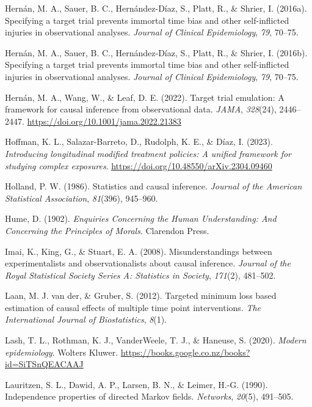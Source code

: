 \documentclass[
  single column]{article}
\newlength{\cslhangindent}
\newenvironment{CSLReferences}[2] %
 {\begin{list}{}{%
  \setlength{\itemindent}{0pt}
  \setlength{\leftmargin}{0pt}
  \setlength{\parsep}{0pt}
  \ifodd #1
   \setlength{\leftmargin}{\cslhangindent}
   \setlength{\itemindent}{-1\cslhangindent}
  \fi
  \setlength{\itemsep}{#2\baselineskip}}}
 {\end{list}}
\begin{document}
\begin{CSLReferences}{1}{0}
Hernán, M. A., Sauer, B. C., Hernández-Díaz, S., Platt, R., \& Shrier,
I. (2016a). Specifying a target trial prevents immortal time bias and
other self-inflicted injuries in observational analyses. \emph{Journal
of Clinical Epidemiology}, \emph{79}, 70--75.

Hernán, M. A., Sauer, B. C., Hernández-Díaz, S., Platt, R., \& Shrier,
I. (2016b). Specifying a target trial prevents immortal time bias and
other self-inflicted injuries in observational analyses. \emph{Journal
of Clinical Epidemiology}, \emph{79}, 70--75.

Hernán, M. A., Wang, W., \& Leaf, D. E. (2022). Target trial emulation:
A framework for causal inference from observational data. \emph{JAMA},
\emph{328}(24), 2446--2447.
\url{https://doi.org/10.1001/jama.2022.21383}

Hoffman, K. L., Salazar-Barreto, D., Rudolph, K. E., \& Díaz, I. (2023).
\emph{Introducing longitudinal modified treatment policies: A unified
framework for studying complex exposures}.
\url{https://doi.org/10.48550/arXiv.2304.09460}

Holland, P. W. (1986). Statistics and causal inference. \emph{Journal of
the American Statistical Association}, \emph{81}(396), 945--960.

Hume, D. (1902). \emph{Enquiries Concerning the Human Understanding: And
Concerning the Principles of Morals}. Clarendon Press.

Imai, K., King, G., \& Stuart, E. A. (2008). Misunderstandings between
experimentalists and observationalists about causal inference.
\emph{Journal of the Royal Statistical Society Series A: Statistics in
Society}, \emph{171}(2), 481--502.

Laan, M. J. van der, \& Gruber, S. (2012). Targeted minimum loss based
estimation of causal effects of multiple time point interventions.
\emph{The International Journal of Biostatistics}, \emph{8}(1).

Lash, T. L., Rothman, K. J., VanderWeele, T. J., \& Haneuse, S. (2020).
\emph{Modern epidemiology}. Wolters Kluwer.
\url{https://books.google.co.nz/books?id=SiTSnQEACAAJ}

Lauritzen, S. L., Dawid, A. P., Larsen, B. N., \& Leimer, H.-G. (1990).
Independence properties of directed {M}arkov fields. \emph{Networks},
\emph{20}(5), 491--505.


\end{CSLReferences}
\end{document}
